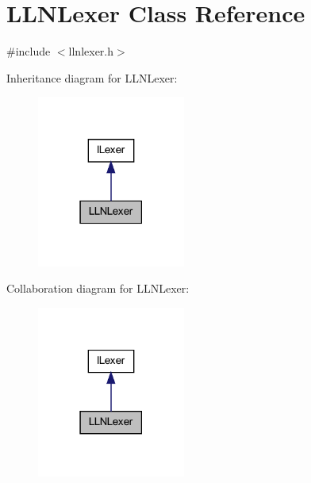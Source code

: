 \hypertarget{class_l_l_n_lexer}{
\section{LLNLexer Class Reference}
\label{class_l_l_n_lexer}
}


{\ttfamily \#include $<$llnlexer.h$>$}



Inheritance diagram for LLNLexer:
\nopagebreak
\begin{figure}[H]
\begin{center}
\leavevmode
\includegraphics[width=138pt]{class_l_l_n_lexer__inherit__graph}
\end{center}
\end{figure}


Collaboration diagram for LLNLexer:
\nopagebreak
\begin{figure}[H]
\begin{center}
\leavevmode
\includegraphics[width=138pt]{class_l_l_n_lexer__coll__graph}
\end{center}
\end{figure}
